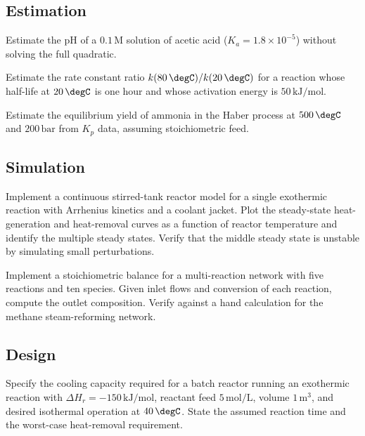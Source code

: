 \subsection*{Estimation}

\begin{exercise}
Estimate the pH of a $0.1\,\text{M}$ solution of acetic acid ($K_a =
1.8 \times 10^{-5}$) without solving the full quadratic.
\end{exercise}

\begin{exercise}
Estimate the rate constant ratio $k(80\,\degC)/k(20\,\degC)$ for a
reaction whose half-life at $20\,\degC$ is one hour and whose
activation energy is $50\,\text{kJ}/\text{mol}$.
\end{exercise}

\begin{exercise}
Estimate the equilibrium yield of ammonia in the Haber process at
$500\,\degC$ and $200\,\text{bar}$ from $K_p$ data, assuming
stoichiometric feed.
\end{exercise}

\subsection*{Simulation}

\begin{exercise}
Implement a continuous stirred-tank reactor model for a single
exothermic reaction with Arrhenius kinetics and a coolant jacket.
Plot the steady-state heat-generation and heat-removal curves as a
function of reactor temperature and identify the multiple steady
states. Verify that the middle steady state is unstable by simulating
small perturbations.
\end{exercise}

\begin{exercise}
Implement a stoichiometric balance for a multi-reaction network with
five reactions and ten species. Given inlet flows and conversion of
each reaction, compute the outlet composition. Verify against a hand
calculation for the methane steam-reforming network.
\end{exercise}

\subsection*{Design}

\begin{exercise}
Specify the cooling capacity required for a batch reactor running an
exothermic reaction with $\Delta H_r = -150\,\text{kJ}/\text{mol}$,
reactant feed $5\,\text{mol}/\text{L}$, volume $1\,\text{m}^3$, and
desired isothermal operation at $40\,\degC$. State the assumed
reaction time and the worst-case heat-removal requirement.
\end{exercise}

